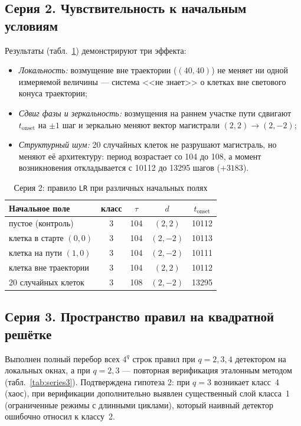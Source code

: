 \documentclass[12pt,a4paper]{article}
\begin{document}
	\subsection{Серия 2. Чувствительность к начальным условиям}
	Результаты (табл.~\ref{tab:series2}) демонстрируют три эффекта:
	\begin{itemize}
		\item \emph{Локальность:} возмущение вне траектории ($(40,40)$) не меняет ни одной измеряемой величины --- система <<не знает>> о клетках вне светового конуса траектории;
		\item \emph{Сдвиг фазы и зеркальность:} возмущения на раннем участке пути сдвигают $t_{\mathrm{onset}}$ на $\pm1$ шаг и зеркально меняют вектор магистрали $(2,2)\to(2,-2)$;
		\item \emph{Структурный шум:} 20 случайных клеток не разрушают магистраль, но меняют её архитектуру: период возрастает со 104 до 108, а момент возникновения откладывается с 10112 до 13295 шагов ($+3183$).
	\end{itemize}
	
	\begin{table}[H]
		\centering
		\caption{Серия 2: правило \texttt{LR} при различных начальных полях}
		\label{tab:series2}
		\begin{tabular}{lcccc}
			\toprule
			Начальное поле & класс & $\tau$ & $d$ & $t_{\mathrm{onset}}$ \\
			\midrule
			пустое (контроль)            & 3 & 104 & $(2,2)$  & 10112 \\
			клетка в старте $(0,0)$     & 3 & 104 & $(2,-2)$ & 10113 \\
			клетка на пути $(1,0)$      & 3 & 104 & $(2,-2)$ & 10111 \\
			клетка вне траектории       & 3 & 104 & $(2,2)$  & 10112 \\
			20 случайных клеток          & 3 & 108 & $(2,-2)$ & 13295 \\
			\bottomrule
		\end{tabular}
	\end{table}
	
	\subsection{Серия 3. Пространство правил на квадратной решётке}
	Выполнен полный перебор всех $4^q$ строк правил при $q=2,3,4$ детектором на локальных окнах, а при $q=2,3$ --- повторная верификация эталонным методом (табл.~\ref{tab:series3}). Подтверждена гипотеза 2: при $q=3$ возникает класс~4 (хаос), при верификации дополнительно выявлен существенный слой класса~1 (ограниченные режимы с длинными циклами), который наивный детектор ошибочно относил к классу~2.
	
\end{document}
